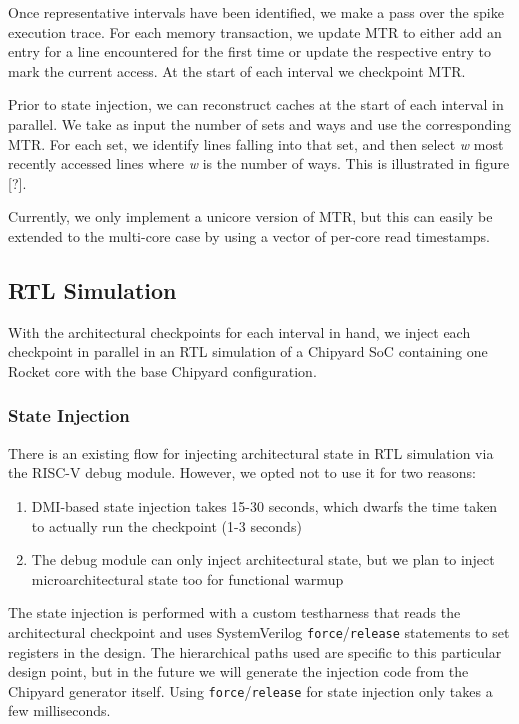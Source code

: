\documentclass[sigplan,nonacm,10pt]{acmart}
\begin{document}
Once representative intervals have been identified, we make a pass over the spike execution trace. For each memory transaction, we update MTR to either add an entry for a line encountered for the first time or update the respective entry to mark the current access. At the start of each interval we checkpoint MTR.

Prior to state injection, we can reconstruct caches at the start of each interval in parallel. We take as input the number of sets and ways and use the corresponding MTR. For each set, we identify lines falling into that set, and then select \textit{w} most recently accessed lines where \textit{w} is the number of ways. This is illustrated in figure [?].

Currently, we only implement a unicore version of MTR, but this can easily be extended to the multi-core case by using a vector of per-core read timestamps.

\subsection{RTL Simulation}

With the architectural checkpoints for each interval in hand, we inject each checkpoint in parallel in an RTL simulation of a Chipyard SoC containing one Rocket core with the base Chipyard configuration.

\subsubsection{State Injection}

There is an existing flow for injecting architectural state in RTL simulation via the RISC-V debug module.
However, we opted not to use it for two reasons:
\begin{enumerate}
  \item DMI-based state injection takes 15-30 seconds, which dwarfs the time taken to actually run the checkpoint (1-3 seconds)
  \item The debug module can only inject architectural state, but we plan to inject microarchitectural state too for functional warmup
\end{enumerate}

The state injection is performed with a custom testharness that reads the architectural checkpoint and uses SystemVerilog \texttt{force}/\texttt{release} statements to set registers in the design.
The hierarchical paths used are specific to this particular design point, but in the future we will generate the injection code from the Chipyard generator itself.
Using \texttt{force}/\texttt{release} for state injection only takes a few milliseconds.
\end{document}
